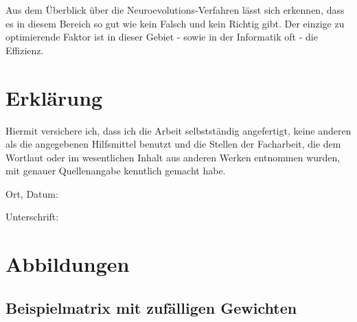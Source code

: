 \documentclass[parskip=half,titlepage]{scrartcl}
\begin{document}
Aus dem Überblick über die Neuroevolutions-Verfahren lässt sich erkennen, dass es in diesem Bereich so gut wie kein Falsch und kein Richtig gibt. Der einzige zu optimierende Faktor ist in dieser Gebiet - sowie in der Informatik oft - die Effizienz. 








\printbibliography[title=Literaturverzeichnis]


\listoffigures


\section*{Erklärung}
Hiermit versichere ich, dass ich die Arbeit selbstständig angefertigt, keine anderen als die angegebenen Hilfsmittel benutzt und die Stellen der Facharbeit, die dem Wortlaut oder im wesentlichen Inhalt aus anderen Werken entnommen wurden, mit genauer Quellenangabe kenntlich gemacht habe.

\vspace{1cm}
Ort, Datum: \underline{\hspace{12cm}}

\vspace{1cm}
Unterschrift:\underline{\hspace{12cm}}


\appendix
\newpage
\section{Abbildungen}
\subsection{Beispielmatrix mit zufälligen Gewichten}
\end{document}
